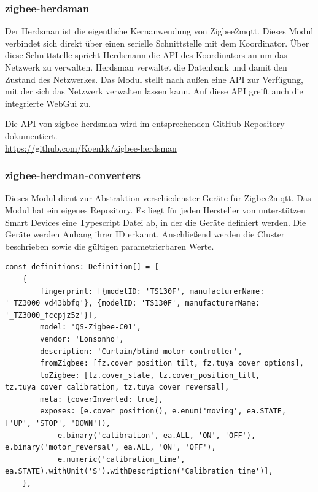 \subsubsection{zigbee-herdsman}

Der Herdsman ist die eigentliche Kernanwendung von Zigbee2mqtt. Dieses Modul verbindet sich direkt über einen serielle Schnittstelle mit dem Koordinator. Über diese Schnittstelle
spricht Herdsmann die API des Koordinators an um das Netzwerk zu verwalten. Herdsman verwaltet die Datenbank und damit den Zustand des Netzwerkes. Das Modul stellt nach außen
eine API zur Verfügung, mit der sich das Netzwerk verwalten lassen kann. Auf diese API greift auch die integrierte WebGui zu.

Die API von zigbee-herdsman wird im entsprechenden GitHub Repository dokumentiert. \\
\url{https://github.com/Koenkk/zigbee-herdsman}

\subsubsection{zigbee-herdman-converters}

Dieses Modul dient zur Abstraktion verschiedenster Geräte für Zigbee2mqtt. Das Modul hat ein eigenes Repository. Es liegt für jeden Hersteller von unterstützen Smart Devices eine Typescript
Datei ab, in der die Geräte definiert werden. Die Geräte werden Anhang ihrer ID erkannt. Anschließend werden die Cluster beschrieben sowie die gültigen parametrierbaren Werte.

\begin{lstlisting}
const definitions: Definition[] = [
    {
        fingerprint: [{modelID: 'TS130F', manufacturerName: '_TZ3000_vd43bbfq'}, {modelID: 'TS130F', manufacturerName: '_TZ3000_fccpjz5z'}],
        model: 'QS-Zigbee-C01',
        vendor: 'Lonsonho',
        description: 'Curtain/blind motor controller',
        fromZigbee: [fz.cover_position_tilt, fz.tuya_cover_options],
        toZigbee: [tz.cover_state, tz.cover_position_tilt, tz.tuya_cover_calibration, tz.tuya_cover_reversal],
        meta: {coverInverted: true},
        exposes: [e.cover_position(), e.enum('moving', ea.STATE, ['UP', 'STOP', 'DOWN']),
            e.binary('calibration', ea.ALL, 'ON', 'OFF'), e.binary('motor_reversal', ea.ALL, 'ON', 'OFF'),
            e.numeric('calibration_time', ea.STATE).withUnit('S').withDescription('Calibration time')],
    },
  \end{lstlisting}

